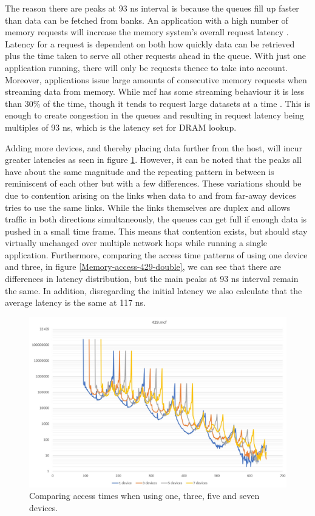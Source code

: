 The reason there are peaks at 93 ns interval is because the queues fill up faster than data can be fetched from banks. An application with a high number of memory requests will increase the memory system's overall request latency \cite{8366939}. Latency for a request is dependent on both how quickly data can be retrieved plus the time taken to serve all other requests ahead in the queue. With just one application running, there will only be requests thence to take into account. Moreover, applications issue large amounts of consecutive memory requests when streaming data from memory. While mcf has some streaming behaviour it is less than 30\% of the time, though it tends to request large datasets at a time \cite{10.1145/3307650.3322229}. This is enough to create congestion in the queues and resulting in request latency being multiples of 93 ns, which is the latency set for DRAM lookup.
\bigskip

Adding more devices, and thereby placing data further from the host, will incur greater latencies as seen in figure \ref{Memory-access-429}. However, it can be noted that the peaks all have about the same magnitude and the repeating pattern in between is reminiscent of each other but with a few differences. These variations should be due to contention arising on the links when data to and from far-away devices tries to use the same links. While the links themselves are duplex and allows traffic in both directions simultaneously, the queues can get full if enough data is pushed in a small time frame. This means that contention exists, but should stay virtually unchanged over multiple network hops while running a single application. Furthermore, comparing the access time patterns of using one device and three, in figure \ref{Memory-access-429-double}, we can see that there are differences in latency distribution, but the main peaks at 93 ns interval remain the same. In addition, disregarding the initial latency we also calculate that the average latency is the same at 117 ns.
\bigskip

\begin{figure}[!ht]
    \centering
    \includegraphics[width=1.0\linewidth]{figure/429-x_4.jpg}
    \caption{Comparing access times when using one, three, five and seven devices.}
    \label{Memory-access-429}
\end{figure}

